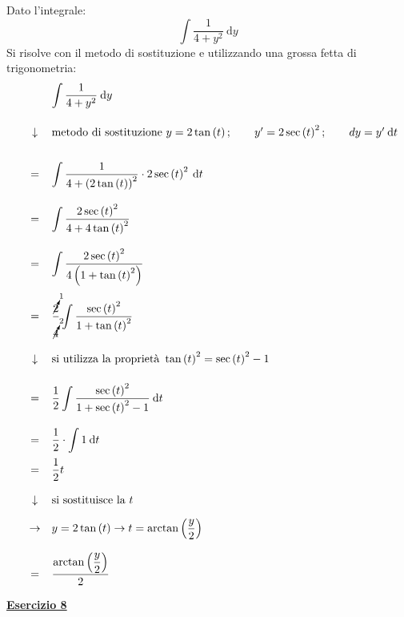 \documentclass[a4paper]{article}
\newcommand{\example}[1]{\textcolor{Green4}{\textbf{#1}}}
\begin{document}
	\noindent
	Dato l'integrale:
	\begin{equation*}
		\displaystyle \int\dfrac{1}{4 + y^{2}} \: \mathrm{d}y
	\end{equation*}
	Si risolve con il metodo di sostituzione e utilizzando una grossa fetta di trigonometria:
	\begin{equation*}
		\begin{array}{rcl}
			&& \displaystyle \int\dfrac{1}{4 + y^{2}} \: \mathrm{d}y \\ [2em]
			&\downarrow& \text{metodo di sostituzione }y = 2\tan\left(t\right); \hspace{2em} y' = 2\sec\left(t\right)^{2}; \hspace{2em} dy = y' \: \mathrm{d}t \\ [2em]
			&=& \displaystyle \int \dfrac{1}{4 + \left(2\tan\left(t\right)\right)^{2}} \cdot 2 \sec\left(t\right)^{2} \: \mathrm{d}t \\ [2em]
			&=& \displaystyle \int \dfrac{2 \sec\left(t\right)^{2}}{4 + 4 \tan\left(t\right)^{2}} \\ [2em]
			&=& \displaystyle \int \dfrac{2 \sec\left(t\right)^{2}}{4\left(1 + \tan\left(t\right)^{2}\right)} \\ [2em]
			&=& \dfrac{\cancelto{1}{2}}{\cancelto{2}{4}} \displaystyle \int \dfrac{\sec\left(t\right)^{2}}{1+\tan\left(t\right)^{2}} \\ [2.5em]
			&\downarrow& \text{si utilizza la proprietà }\tan\left(t\right)^{2} = \sec\left(t\right)^{2}-1 \\ [1.5em]
			&=& \dfrac{1}{2} \displaystyle\int\dfrac{\sec\left(t\right)^{2}}{1 + \sec\left(t\right)^{2} - 1} \: \mathrm{d}t \\ [2em]
			&=& \dfrac{1}{2} \cdot \displaystyle \int 1 \: \mathrm{d}t \\ [1em]
			&=& \dfrac{1}{2}t \\ [1.5em]
			&\downarrow& \text{si sostituisce la }t \\ [1em]
			&\rightarrow& y = 2\tan\left(t\right) \rightarrow t = \arctan\left(\dfrac{y}{2}\right) \\ [1.5em]
			&=& \dfrac{\arctan\left(\dfrac{y}{2}\right)}{2}
		\end{array}
	\end{equation*}\newpage

	\begin{flushleft}
		\example{\underline{Esercizio 8}}
	\end{flushleft}
	
\end{document}
